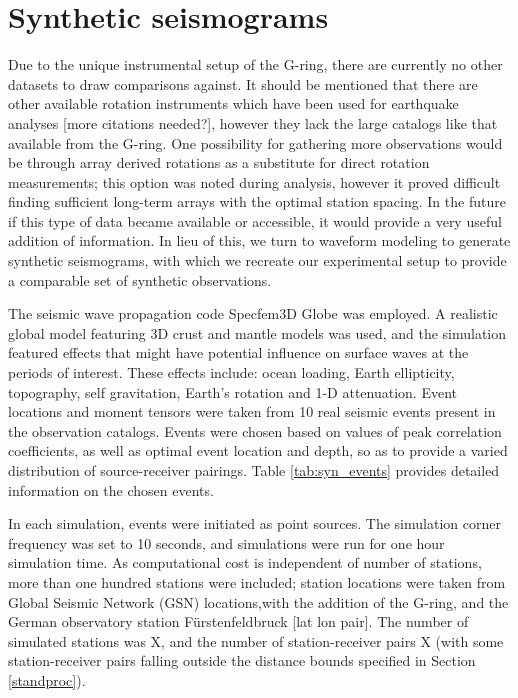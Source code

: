 \documentclass{gji}
\begin{document}
\section{Synthetic seismograms}
Due to the unique instrumental setup of the G-ring, there are currently no other datasets to draw comparisons against. It should be mentioned that there are other available rotation instruments which have been used for earthquake analyses \cite{donner2017comparing} [more citations needed?], however they lack the large catalogs like that available from the G-ring. One possibility for gathering more observations would be through array derived rotations as a substitute for direct rotation measurements; this option was noted during analysis, however it proved difficult finding sufficient long-term arrays with the optimal station spacing. In the future if this type of data became available or accessible, it would provide a very useful addition of information. In lieu of this, we turn to waveform modeling to generate synthetic seismograms, with which we recreate our experimental setup to provide a comparable set of synthetic observations.

The seismic wave propagation code Specfem3D Globe was employed. A realistic global model featuring 3D crust and mantle models was used, and the simulation featured effects that might have potential influence on surface waves at the periods of interest. These effects include: ocean loading, Earth ellipticity, topography, self gravitation, Earth's rotation and 1-D attenuation. Event locations and moment tensors were taken from 10 real seismic events present in the observation catalogs. Events were chosen based on values of peak correlation coefficients, as well as optimal event location and depth, so as to provide a varied distribution of source-receiver pairings. Table \ref{tab:syn_events} provides detailed information on the chosen events. 

In each simulation, events were initiated as point sources. The simulation corner frequency was set to 10 seconds, and simulations were run for one hour simulation time. As computational cost is independent of number of stations, more than one hundred stations were included; station locations were taken from Global Seismic Network (GSN) locations,with the addition of the G-ring, and the German observatory station F\"urstenfeldbruck [lat lon pair]. The number of simulated stations was X, and the number of station-receiver pairs X (with some station-receiver pairs falling outside the distance bounds specified in Section \ref{standproc}).
\end{document}
